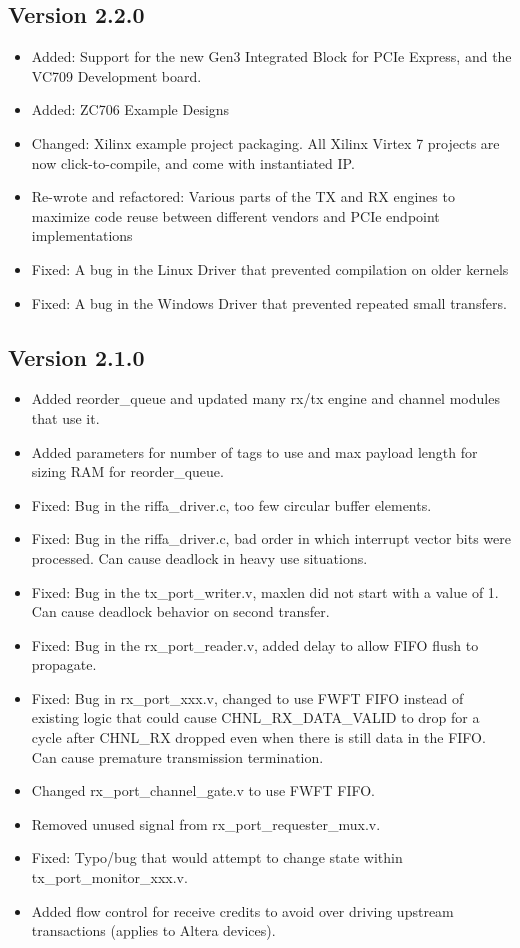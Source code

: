 \documentclass{refrep}
\begin{document}
\subsection{Version 2.2.0}
\begin{itemize}
\item Added: Support for the new Gen3 Integrated Block for PCIe Express, and the VC709 Development board.
\item Added: ZC706 Example Designs
\item Changed: Xilinx example project packaging. All Xilinx Virtex 7 projects are now click-to-compile, and come with instantiated IP.
\item Re-wrote and refactored: Various parts of the TX and RX engines to maximize code reuse between different vendors and PCIe endpoint implementations
\item Fixed: A bug in the Linux Driver that prevented compilation on older kernels
\item Fixed: A bug in the Windows Driver that prevented repeated small transfers.
\end{itemize}
\subsection{Version 2.1.0}
\begin{itemize}

\item Added reorder\_queue and updated many rx/tx engine and channel modules that 
  use it.
\item Added parameters for number of tags to use and max payload length for sizing 
  RAM for reorder\_queue.
\item Fixed: Bug in the riffa\_driver.c, too few circular buffer elements.
\item Fixed: Bug in the riffa\_driver.c, bad order in which interrupt vector bits 
  were processed. Can cause deadlock in heavy use situations.
\item Fixed: Bug in the tx\_port\_writer.v, maxlen did not start with a value of 1.
  Can cause deadlock behavior on second transfer.
\item Fixed: Bug in the rx\_port\_reader.v, added delay to allow FIFO flush to 
  propagate.
\item Fixed: Bug in rx\_port\_xxx.v, changed to use FWFT FIFO instead of existing 
  logic that could cause CHNL\_RX\_DATA\_VALID to drop for a cycle after CHNL\_RX 
  dropped even when there is still data in the FIFO. Can cause premature 
  transmission termination.
\item Changed rx\_port\_channel\_gate.v to use FWFT FIFO.
\item Removed unused signal from rx\_port\_requester\_mux.v.
\item Fixed: Typo/bug that would attempt to change state within 
  tx\_port\_monitor\_xxx.v.
\item Added flow control for receive credits to avoid over driving upstream transactions
  (applies to Altera devices).
\end{itemize}
\end{document}
